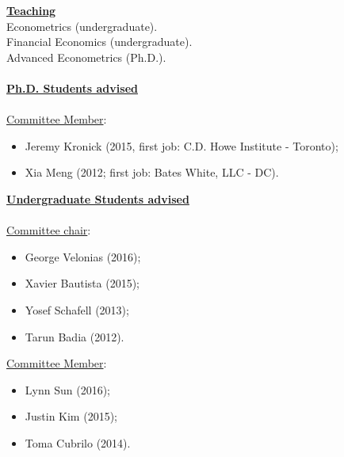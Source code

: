 \documentclass[12pt]{article}
\begin{document}
\underline{\textbf{Teaching}}\\
Econometrics (undergraduate).\\
Financial Economics (undergraduate). \\
Advanced Econometrics (Ph.D.). \\ \\
\underline{\textbf{Ph.D. Students advised}} \\ \\
\underline{Committee Member}: 
\begin{itemize}
	\item Jeremy Kronick (2015, first job: C.D. Howe Institute - Toronto);
	\item Xia Meng (2012; first job: Bates White, LLC - DC). 
\end{itemize}
\underline{\textbf{Undergraduate Students advised}} \\ \\
\underline{Committee chair}: 
\begin{itemize}
	\item George Velonias (2016);
	\item Xavier Bautista (2015);
	\item Yosef Schafell (2013);
	\item Tarun Badia (2012). 
\end{itemize}
\underline{Committee Member}: 
\begin{itemize}
	\item Lynn Sun (2016);
	\item Justin Kim (2015);
	\item Toma Cubrilo (2014).
\end{itemize}
\end{document}
